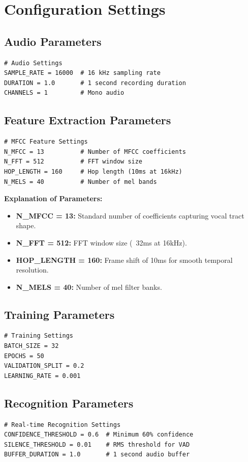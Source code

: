 \documentclass[a4paper,12pt]{article}
\begin{document}
\section{Configuration Settings}

\subsection{Audio Parameters}
\begin{lstlisting}[style=pythonstyle]
# Audio Settings
SAMPLE_RATE = 16000  # 16 kHz sampling rate
DURATION = 1.0       # 1 second recording duration
CHANNELS = 1         # Mono audio
\end{lstlisting}

\subsection{Feature Extraction Parameters}
\begin{lstlisting}[style=pythonstyle]
# MFCC Feature Settings
N_MFCC = 13          # Number of MFCC coefficients
N_FFT = 512          # FFT window size
HOP_LENGTH = 160     # Hop length (10ms at 16kHz)
N_MELS = 40          # Number of mel bands
\end{lstlisting}

\textbf{Explanation of Parameters:}
\begin{itemize}
    \item \textbf{N\_MFCC = 13:} Standard number of coefficients capturing vocal tract shape.
    \item \textbf{N\_FFT = 512:} FFT window size (~32ms at 16kHz).
    \item \textbf{HOP\_LENGTH = 160:} Frame shift of 10ms for smooth temporal resolution.
    \item \textbf{N\_MELS = 40:} Number of mel filter banks.
\end{itemize}

\subsection{Training Parameters}
\begin{lstlisting}[style=pythonstyle]
# Training Settings
BATCH_SIZE = 32
EPOCHS = 50
VALIDATION_SPLIT = 0.2
LEARNING_RATE = 0.001
\end{lstlisting}

\subsection{Recognition Parameters}
\begin{lstlisting}[style=pythonstyle]
# Real-time Recognition Settings
CONFIDENCE_THRESHOLD = 0.6  # Minimum 60% confidence
SILENCE_THRESHOLD = 0.01    # RMS threshold for VAD
BUFFER_DURATION = 1.0       # 1 second audio buffer
\end{lstlisting}
\end{document}
